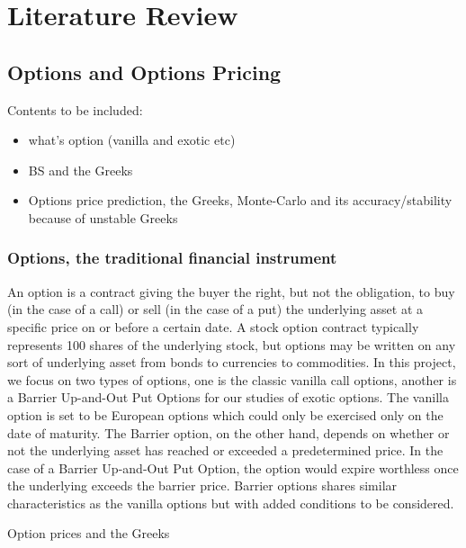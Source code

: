 \documentclass{report}
\begin{document}
\chapter{Literature Review}

\section{Options and Options Pricing}

Contents to be included:
\begin{itemize}
\item what's option (vanilla and exotic etc)
\item BS and the Greeks
\item Options price prediction, the Greeks, Monte-Carlo and its accuracy/stability because of unstable Greeks
\end{itemize}

\subsection{Options, the traditional financial instrument}
An option is a contract giving the buyer the right, but not the obligation, to buy (in the case of a call) or sell (in the case of a put) the underlying asset at a specific price on or before a certain date. A stock option contract typically represents 100 shares of the underlying stock, but options may be written on any sort of underlying asset from bonds to currencies to commodities.
In this project, we focus on two types of options, one is the classic vanilla call options, another is a Barrier Up-and-Out Put Options for our studies of exotic options. The vanilla option is set to be European options which could only be exercised only on the date of maturity. The Barrier option, on the other hand, depends on whether or not the underlying asset has reached or exceeded a predetermined price. In the case of a Barrier Up-and-Out Put Option, the option would expire worthless once the underlying exceeds the barrier price. Barrier options shares similar characteristics as the vanilla options but with added conditions to be considered. 

Option prices and the Greeks
\end{document}
